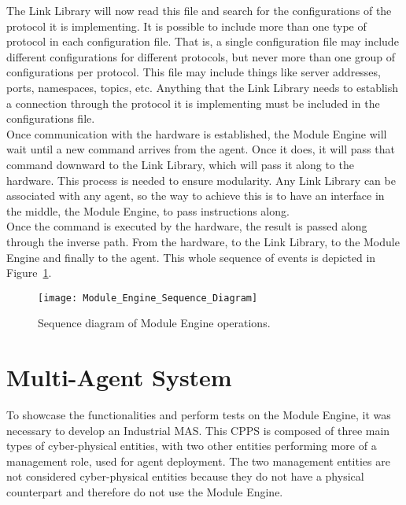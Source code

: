 The Link Library will now read this file and search for the configurations of the protocol it is implementing. It is possible to include more than one type of protocol in each configuration file. That is, a single configuration file may include different configurations for different protocols, but never more than one group of configurations per protocol. This file may include things like server addresses, ports, namespaces, topics, etc. Anything that the Link Library needs to establish a connection through the protocol it is implementing must be included in the configurations file.\\

Once communication with the hardware is established, the Module Engine will wait until a new command arrives from the agent. Once it does, it will pass that command downward to the Link Library, which will pass it along to the hardware. This process is needed to ensure modularity. Any Link Library can be associated with any agent, so the way to achieve this is to have an interface in the middle, the Module Engine, to pass instructions along.\\

Once the command is executed by the hardware, the result is passed along through the inverse path. From the hardware, to the Link Library, to the Module Engine and finally to the agent. This whole sequence of events is depicted in Figure~\ref{fig:module_engine_sequence_diagram}.

\begin{figure}[h!]
	\centering
	\texttt{[image: Module\_Engine\_Sequence\_Diagram]}
	\caption{Sequence diagram of Module Engine operations.}
	\label{fig:module_engine_sequence_diagram}
\end{figure}

\section{Multi-Agent System}
\label{sec:multi-agent_system}

To showcase the functionalities and perform tests on the Module Engine, it was necessary to develop an Industrial \acrfull{MAS}. This \acrlong{CPPS} is composed of three main types of cyber-physical entities, with two other entities performing more of a management role, used for agent deployment. The two management entities are not considered cyber-physical entities because they do not have a physical counterpart and therefore do not use the Module Engine.\\

